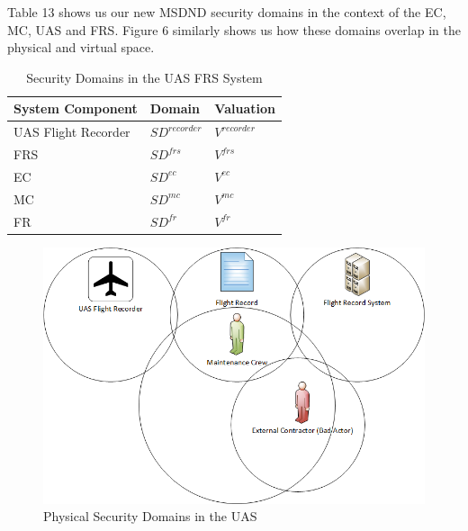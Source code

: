 \documentclass[10pt,journal,compsoc]{IEEEtran}
\begin{document}
Table 13 shows us our new MSDND security domains in the context of the EC, MC, UAS and FRS. Figure 6 similarly shows us how these domains overlap in the physical and virtual space.  

\begin{table}[]
  \caption{Security Domains in the UAS FRS System}
  \label{tab:security-domains}
  \centering
  \begin{tabular}{lll}
  \hline
  \textbf{System Component} & \textbf{Domain} & \textbf{Valuation} \\
  \hline
  UAS Flight Recorder       & $SD^{recorder}$ & $V^{recorder}$     \\
  FRS                       & $SD^{frs}$      & $V^{frs}$          \\
  EC                        & $SD^{ec}$       & $V^{ec}$           \\
  MC                        & $SD^{mc}$       & $V^{mc}$           \\
  FR                        & $SD^{fr}$       & $V^{fr}$          
  \end{tabular}
\end{table}

\begin{figure}[t]
  \caption{Physical Security Domains in the UAS} 
  \includegraphics[scale=0.43]{SDs.png}
\end{figure}


\end{document}
